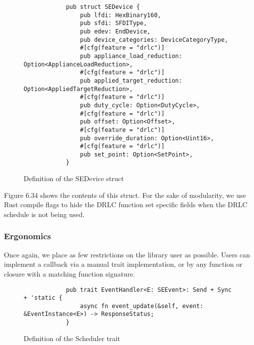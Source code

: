 \begin{figure}[h]
    \begin{center}
        \begin{lstlisting}
            pub struct SEDevice {
                pub lfdi: HexBinary160,
                pub sfdi: SFDIType,
                pub edev: EndDevice,
                pub device_categories: DeviceCategoryType,
                #[cfg(feature = "drlc")]
                pub appliance_load_reduction: Option<ApplianceLoadReduction>,
                #[cfg(feature = "drlc")]
                pub applied_target_reduction: Option<AppliedTargetReduction>,
                #[cfg(feature = "drlc")]
                pub duty_cycle: Option<DutyCycle>,
                #[cfg(feature = "drlc")]
                pub offset: Option<Offset>,
                #[cfg(feature = "drlc")]
                pub override_duration: Option<Uint16>,
                #[cfg(feature = "drlc")]
                pub set_point: Option<SetPoint>,
            }
        \end{lstlisting}
        \label{fig:sedevicestruct}
        \vspace{-10pt}
        \caption{Definition of the SEDevice struct}
    \end{center}
\end{figure}

Figure 6.34 shows the contents of this struct. For the sake of modularity, we use Rust compile flags to hide the DRLC function set specific fields when the DRLC schedule is not being used. 

\subsubsection{Ergonomics}
Once again, we place as few restrictions on the library user as possible. Users can implement a callback via a manual trait implementation, or by any function or closure with a matching function signature.

\begin{figure}[h]
    \begin{center}
        \begin{lstlisting}
            pub trait EventHandler<E: SEEvent>: Send + Sync + 'static {
                async fn event_update(&self, event: &EventInstance<E>) -> ResponseStatus;
            }
        \end{lstlisting}
        \label{fig:eventhandlertrait}
        \vspace{-10pt}
        \caption{Definition of the Scheduler trait}
    \end{center}
\end{figure}

